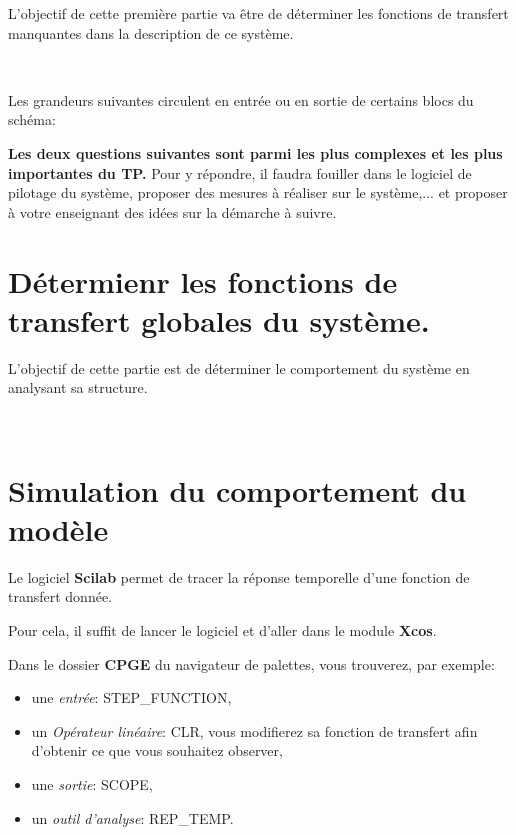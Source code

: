 L'objectif de cette première partie va être de déterminer les fonctions de transfert manquantes dans la description de ce système.

~\


Les grandeurs suivantes circulent en entrée ou en sortie de certains blocs du schéma:
\begin{itemize}
 \lesgrandeurs
\end{itemize}
\textbf{Les deux questions suivantes sont parmi les plus complexes et les plus importantes du TP.} Pour y répondre, il faudra fouiller dans le logiciel de pilotage du système, proposer des mesures à réaliser sur le système,... et proposer à votre enseignant des idées sur la démarche à suivre.





\section{Détermienr les fonctions de transfert globales du système.}

L'objectif de cette partie est de déterminer le comportement du système en analysant sa structure.

~\




\section{Simulation du comportement du modèle}

Le logiciel \textbf{Scilab} permet de tracer la réponse temporelle d'une fonction de transfert donnée.

Pour cela, il suffit de lancer le logiciel et d'aller dans le module \textbf{Xcos}.

Dans le dossier \textbf{CPGE} du navigateur de palettes, vous trouverez, par exemple:
\begin{itemize}
 \item une \textit{entrée}: STEP\_FUNCTION,
 \item un \textit{Opérateur linéaire}: CLR, vous modifierez sa fonction de transfert afin d'obtenir ce que vous souhaitez observer,
 \item une \textit{sortie}: SCOPE,
 \item un \textit{outil d'analyse}: REP\_TEMP.
\end{itemize}

